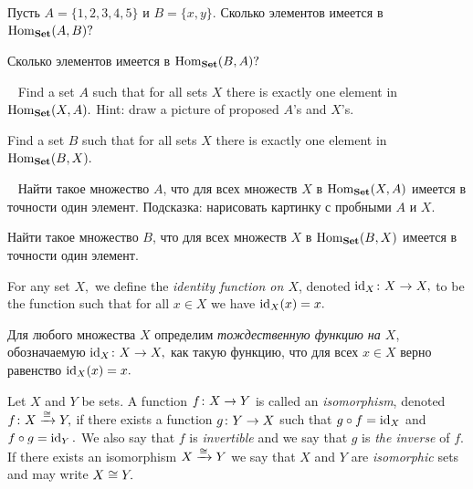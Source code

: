 \documentclass[../main/CT4S-EN-RU]{subfiles}
\begin{document}
\begin{exerciseRUS}
Пусть $A=\{1,2,3,4,5\}$ и $B=\{x,y\}.$ 
\sexc Сколько элементов имеется в $\operatorname{Hom}_{\mathbf{Set}}(A,B)?$ 
\item Сколько элементов имеется в $\operatorname{Hom}_{\mathbf{Set}}(B,A)?$
\endsexc
\end{exerciseRUS}

\begin{exerciseENG}~
\sexc Find a set $A$ such that for all sets $X$ there is exactly one element in $\operatorname{Hom}_{\mathbf{Set}}(X,A).$ Hint: draw a picture of proposed $A$'s and $X$'s.
\item Find a set $B$ such that for all sets $X$ there is exactly one element in $\operatorname{Hom}_{\mathbf{Set}}(B,X).$
\endsexc 
\end{exerciseENG}

\begin{exerciseRUS}~
\sexc Найти такое множество $A$, что для всех множеств $X$ в $\operatorname{Hom}_{\mathbf{Set}}(X,A)$ имеется в точности один элемент. Подсказка: нарисовать картинку с пробными $A$ и $X.$
\item Найти такое множество $B$, что для всех множеств $X$ в $\operatorname{Hom}_{\mathbf{Set}}(B,X)$ имеется в точности один элемент.
\endsexc 
\end{exerciseRUS}

\begin{blockENG}
For any set $X,$ we define the {\em identity function on $X$}, denoted $\operatorname{id}_X\colon X\rightarrow X,$ to be the function such that for all $x\in X$ we have $\operatorname{id}_X(x)=x.$
\end{blockENG}

\begin{blockRUS}
Для любого множества $X$ определим {\em тождественную функцию на $X$}, обозначаемую $\operatorname{id}_X\colon X\rightarrow X,$ как такую функцию, что для всех $x\in X$ верно равенство $\operatorname{id}_X(x)=x.$
\end{blockRUS}

\begin{definitionENG}[Isomorphism]\label{def:iso in set} 
Let $X$ and $Y$ be sets. A function $f\colon X\rightarrow Y$ is called an {\em isomorphism}, denoted $f\colon X\xrightarrow{\cong}Y,$ if there exists a function $g\colon Y\rightarrow X$ such that $g\circ f=\operatorname{id}_X$ and $f\circ g=\operatorname{id}_Y.$ We also say that $f$ is {\em invertible} and we say that $g$ is {\em the inverse} of $f.$ If there exists an isomorphism $X\xrightarrow{\cong} Y$ we say that $X$ and $Y$ are {\em isomorphic} sets and may write $X\cong Y.$ 
\end{definitionENG}
\end{document}
